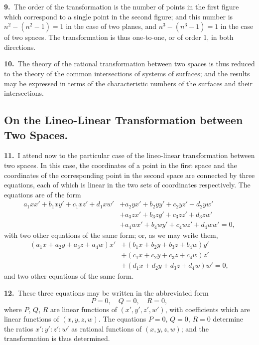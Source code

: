\documentclass[11pt,a4paper]{article}
\begin{document}
\textbf{9.}\ The order of the transformation is the number of points in the first figure which correspond to a single point in the second figure; and this number is $n^2 - (n^2 - 1) = 1$ in the case of two planes, and $n^3 - (n^3 - 1) = 1$ in the case of two spaces. The transformation is thus one-to-one, or of order 1, in both directions.

\textbf{10.}\ The theory of the rational transformation between two spaces is thus reduced to the theory of the common intersections of systems of surfaces; and the results may be expressed in terms of the characteristic numbers of the surfaces and their intersections.

\newpage
\setcounter{page}{194}

\subsection*{On the Lineo-Linear Transformation between Two Spaces.}

\textbf{11.}\ I attend now to the particular case of the lineo-linear transformation between two spaces. In this case, the coordinates of a point in the first space and the coordinates of the corresponding point in the second space are connected by three equations, each of which is linear in the two sets of coordinates respectively. The equations are of the form
\begin{align*}
a_1 x x' + b_1 x y' + c_1 x z' + d_1 x w' &+ a_2 y x' + b_2 y y' + c_2 y z' + d_2 y w'\\
&+ a_3 z x' + b_3 z y' + c_3 z z' + d_3 z w'\\
&+ a_4 w x' + b_4 w y' + c_4 w z' + d_4 w w' = 0,
\end{align*}
with two other equations of the same form; or, as we may write them,
\begin{align*}
(a_1 x + a_2 y + a_3 z + a_4 w) x' &+ (b_1 x + b_2 y + b_3 z + b_4 w) y'\\
&+ (c_1 x + c_2 y + c_3 z + c_4 w) z'\\
&+ (d_1 x + d_2 y + d_3 z + d_4 w) w' = 0,
\end{align*}
and two other equations of the same form.

\textbf{12.}\ These three equations may be written in the abbreviated form
\[
P = 0,\quad Q = 0,\quad R = 0,
\]
where $P$, $Q$, $R$ are linear functions of $(x', y', z', w')$, with coefficients which are linear functions of $(x, y, z, w)$. The equations $P = 0$, $Q = 0$, $R = 0$ determine the ratios $x' : y' : z' : w'$ as rational functions of $(x, y, z, w)$; and the transformation is thus determined.
\end{document}
